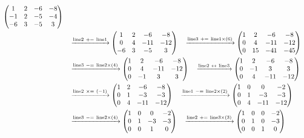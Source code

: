 \documentclass{ltjsarticle}
\begin{document}
\begin{align*}
 \begin{pmatrix}
 1 & 2 & - 6 & - 8\\
 -1 & 2 & - 5 & - 4\\
 - 6 & 3 & - 5 & 3
\end{pmatrix}\allowdisplaybreaks\\
&\ \ \ \xrightarrow{ \text{line} 2 \ +=\  \text{line} 1 } %
\begin{pmatrix}
 1 & 2 & - 6 & - 8\\
 0 & 4 & - 11 & - 12\\
 - 6 & 3 & - 5 & 3
\end{pmatrix}\ \ \ \xrightarrow{ \text{line} 3 \ +=\  \text{line} 1 \times\left( 6 \right)} %
\begin{pmatrix}
 1 & 2 & - 6 & - 8\\
 0 & 4 & - 11 & - 12\\
 0 & 15 & - 41 & - 45
\end{pmatrix}\allowdisplaybreaks\\
 &\ \ \ \xrightarrow{ \text{line} 3 \ -=\  \text{line} 2 \times\left( 4 \right)} %
\begin{pmatrix}
 1 & 2 & - 6 & - 8\\
 0 & 4 & - 11 & - 12\\
 0 & -1 & 3 & 3
\end{pmatrix}\ \ \ \xrightarrow{ \text{line} 2 \ \leftrightarrow\  \text{line} 3 } %
\begin{pmatrix}
 1 & 2 & - 6 & - 8\\
 0 & -1 & 3 & 3\\
 0 & 4 & - 11 & - 12
\end{pmatrix}\allowdisplaybreaks\\
 &\ \ \ \xrightarrow{ \text{line} 2 \ \times=\ \left( - 1 \right)} %
\begin{pmatrix}
 1 & 2 & - 6 & - 8\\
 0 & 1 & - 3 & - 3\\
 0 & 4 & - 11 & - 12
\end{pmatrix}\ \ \ \xrightarrow{ \text{line} 1 \ -=\  \text{line} 2 \times\left( 2 \right)} %
\begin{pmatrix}
 1 & 0 & 0 & - 2\\
 0 & 1 & - 3 & - 3\\
 0 & 4 & - 11 & - 12
\end{pmatrix}\allowdisplaybreaks\\
 &\ \ \ \xrightarrow{ \text{line} 3 \ -=\  \text{line} 2 \times\left( 4 \right)} %
\begin{pmatrix}
 1 & 0 & 0 & - 2\\
 0 & 1 & - 3 & - 3\\
 0 & 0 & 1 & 0
\end{pmatrix}\ \ \ \xrightarrow{ \text{line} 2 \ +=\  \text{line} 3 \times\left( 3 \right)} %
\begin{pmatrix}
 1 & 0 & 0 & - 2\\
 0 & 1 & 0 & - 3\\
 0 & 0 & 1 & 0
\end{pmatrix}
\end{align*}
\end{document}

